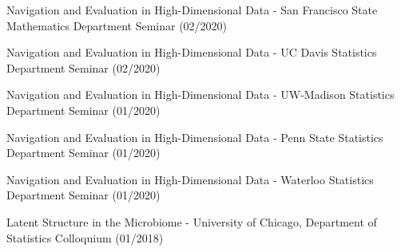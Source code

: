 \documentclass[letterpaper]{article}
\renewenvironment{itemize}{
  \begin{list}{}{
    \setlength{\leftmargin}{1.5em}
  }
}{
  \end{list}
}
\begin{document}
\begin{itemize}
  \item Navigation and Evaluation in High-Dimensional Data - San Francisco State Mathematics Department Seminar (02/2020)
  \item Navigation and Evaluation in High-Dimensional Data - UC Davis Statistics Department Seminar (02/2020)
  \item Navigation and Evaluation in High-Dimensional Data - UW-Madison Statistics Department Seminar (01/2020)
  \item Navigation and Evaluation in High-Dimensional Data - Penn State Statistics Department Seminar (01/2020)
  \item Navigation and Evaluation in High-Dimensional Data - Waterloo Statistics Department Seminar (01/2020)
  \item Latent Structure in the Microbiome - University of Chicago, Department of Statistics Colloquium (01/2018)
\end{itemize}
\end{document}
